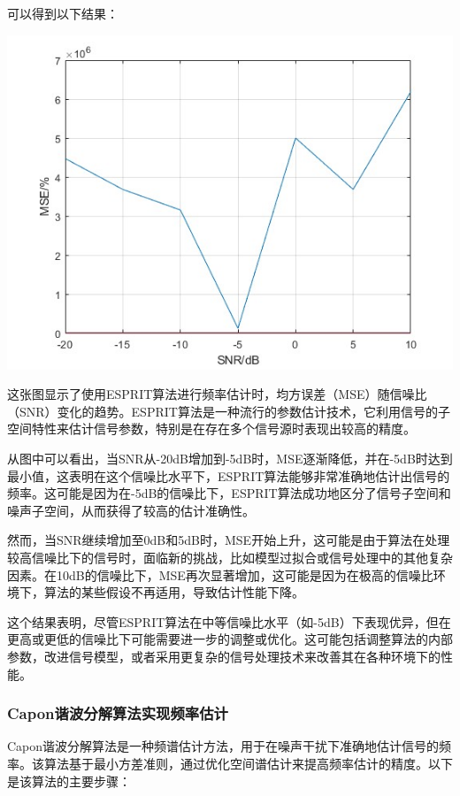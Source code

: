 \documentclass[a4paper,12pt]{article}
\begin{document}
可以得到以下结果：

\centering 
\includegraphics[width=0.8\linewidth]{images/2_Application/esprit.jpg}
\justifying

这张图显示了使用ESPRIT算法进行频率估计时，均方误差（MSE）随信噪比（SNR）变化的趋势。ESPRIT算法是一种流行的参数估计技术，它利用信号的子空间特性来估计信号参数，特别是在存在多个信号源时表现出较高的精度。

从图中可以看出，当SNR从-20dB增加到-5dB时，MSE逐渐降低，并在-5dB时达到最小值，这表明在这个信噪比水平下，ESPRIT算法能够非常准确地估计出信号的频率。这可能是因为在-5dB的信噪比下，ESPRIT算法成功地区分了信号子空间和噪声子空间，从而获得了较高的估计准确性。

然而，当SNR继续增加至0dB和5dB时，MSE开始上升，这可能是由于算法在处理较高信噪比下的信号时，面临新的挑战，比如模型过拟合或信号处理中的其他复杂因素。在10dB的信噪比下，MSE再次显著增加，这可能是因为在极高的信噪比环境下，算法的某些假设不再适用，导致估计性能下降。

这个结果表明，尽管ESPRIT算法在中等信噪比水平（如-5dB）下表现优异，但在更高或更低的信噪比下可能需要进一步的调整或优化。这可能包括调整算法的内部参数，改进信号模型，或者采用更复杂的信号处理技术来改善其在各种环境下的性能。


\subsubsection{Capon谐波分解算法实现频率估计}
Capon谐波分解算法是一种频谱估计方法\cite{capon1969high}，用于在噪声干扰下准确地估计信号的频率。该算法基于最小方差准则，通过优化空间谱估计来提高频率估计的精度。以下是该算法的主要步骤：
\end{document}

